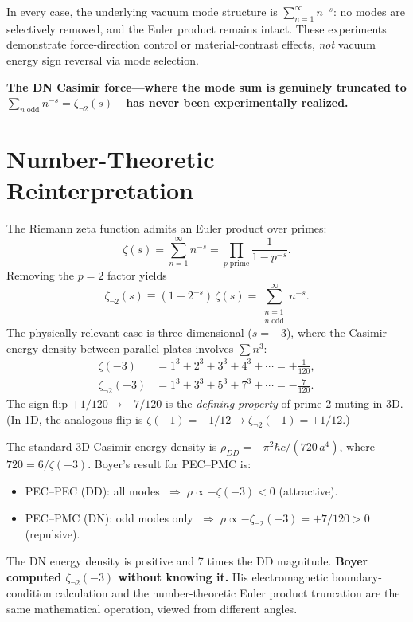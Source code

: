 \documentclass[aps,prd,twocolumn,superscriptaddress,nofootinbib]{revtex4-2}
\begin{document}
In every case, the underlying vacuum mode structure is
$\sum_{n=1}^{\infty}n^{-s}$: no modes are selectively removed,
and the Euler product remains intact.  These experiments
demonstrate force-direction control or material-contrast effects,
\emph{not} vacuum energy sign reversal via mode selection.

\textbf{The DN Casimir force---where the mode sum is genuinely
truncated to $\sum_{n\;\mathrm{odd}}n^{-s}=\zeta_{\neg 2}(s)$---has
never been experimentally realized.}

\section{Number-Theoretic Reinterpretation}

The Riemann zeta function admits an Euler product over primes:
\begin{equation}\label{eq:euler}
  \zeta(s)=\sum_{n=1}^{\infty}n^{-s}
  =\prod_{p\;\mathrm{prime}}\frac{1}{1-p^{-s}}.
\end{equation}
Removing the $p{=}2$ factor yields
\begin{equation}\label{eq:zeta2}
  \zeta_{\neg 2}(s)\equiv(1{-}2^{-s})\,\zeta(s)
  =\sum_{\substack{n=1\\n\;\mathrm{odd}}}^{\infty}n^{-s}.
\end{equation}
The physically relevant case is three-dimensional ($s=-3$),
where the Casimir energy density between parallel plates involves
$\sum n^3$:
\begin{align}
  \zeta(-3)&=1^3{+}2^3{+}3^3{+}4^3{+}\cdots=+\tfrac{1}{120},\label{eq:z3}\\
  \zeta_{\neg 2}(-3)&=1^3{+}3^3{+}5^3{+}7^3{+}\cdots=-\tfrac{7}{120}.\label{eq:z3neg}
\end{align}
The sign flip $+1/120\to-7/120$ is the
\emph{defining property} of prime-2 muting in 3D.
(In 1D, the analogous flip is
$\zeta(-1)=-1/12\to\zeta_{\neg 2}(-1)=+1/12$.)

The standard 3D Casimir energy density is
$\rho_{DD}=-\pi^2\hbar c/(720\,a^4)$, where $720=6/\zeta(-3)$.
Boyer's result for PEC--PMC is:
\begin{itemize}
\item PEC--PEC (DD): all modes
$\;\Rightarrow\;\rho\propto -\zeta(-3)<0$ (attractive).
\item PEC--PMC (DN): odd modes only
$\;\Rightarrow\;\rho\propto -\zeta_{\neg 2}(-3)=+7/120>0$ (repulsive).
\end{itemize}
The DN energy density is positive and 7 times the DD magnitude.
\textbf{Boyer computed $\zeta_{\neg 2}(-3)$ without knowing it.}
His electromagnetic boundary-condition calculation and the
number-theoretic Euler product truncation are the same
mathematical operation, viewed from different angles.
\end{document}
